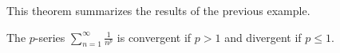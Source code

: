 \begin{frame}
This theorem summarizes the results of the previous example.
\begin{theorem}
The $p$-series $\displaystyle \sum_{n=1}^\infty \frac{1}{n^p}$ is convergent if $p > 1$ and divergent if $p \leq 1$.
\end{theorem}
\end{frame}

